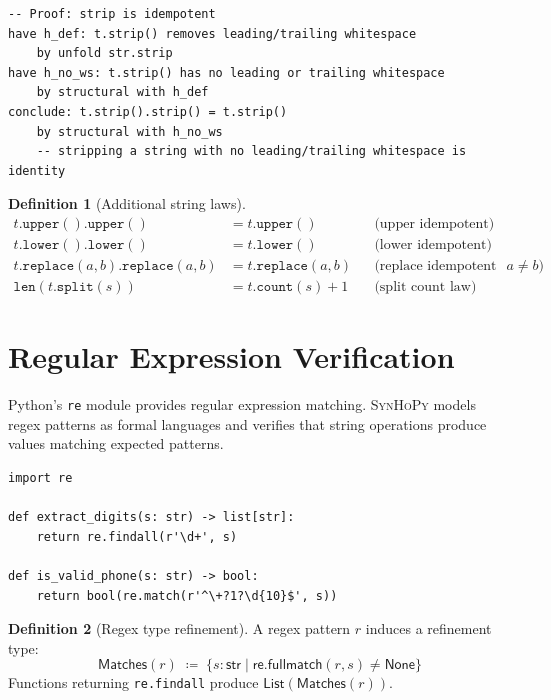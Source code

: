 \documentclass[11pt,a4paper]{report}
\theoremstyle{definition}
\newtheorem{definition}{Definition}[chapter]
\theoremstyle{plain}
\newcommand{\defeq}{\coloneqq}
\newcommand{\synhopy}{\textsc{SynHoPy}}
\begin{document}
\begin{lstlisting}[style=proof]
-- Proof: strip is idempotent
have h_def: t.strip() removes leading/trailing whitespace
    by unfold str.strip
have h_no_ws: t.strip() has no leading or trailing whitespace
    by structural with h_def
conclude: t.strip().strip() = t.strip()
    by structural with h_no_ws
    -- stripping a string with no leading/trailing whitespace is identity
\end{lstlisting}

\begin{definition}[Additional string laws]
\begin{align*}
  t.\texttt{upper}().\texttt{upper}() &= t.\texttt{upper}()
    &&\text{(upper idempotent)} \\
  t.\texttt{lower}().\texttt{lower}() &= t.\texttt{lower}()
    &&\text{(lower idempotent)} \\
  t.\texttt{replace}(a, b).\texttt{replace}(a, b)
    &= t.\texttt{replace}(a, b)
    &&\text{(replace idempotent if } a \neq b\text{)} \\
  \texttt{len}(t.\texttt{split}(s))
    &= t.\texttt{count}(s) + 1
    &&\text{(split count law)}
\end{align*}
\end{definition}

\section{Regular Expression Verification}

Python's \texttt{re} module provides regular expression matching.
\synhopy{} models regex patterns as formal languages and verifies that
string operations produce values matching expected patterns.

\begin{lstlisting}[style=python]
import re

def extract_digits(s: str) -> list[str]:
    return re.findall(r'\d+', s)

def is_valid_phone(s: str) -> bool:
    return bool(re.match(r'^\+?1?\d{10}$', s))
\end{lstlisting}

\begin{definition}[Regex type refinement]
A regex pattern $r$ induces a refinement type:
\[
  \mathsf{Matches}(r) \;\defeq\; \{s : \mathsf{str} \mid
    \mathsf{re.fullmatch}(r, s) \neq \mathsf{None}\}
\]
Functions returning \texttt{re.findall} produce
$\mathsf{List}(\mathsf{Matches}(r))$.
\end{definition}
\end{document}
